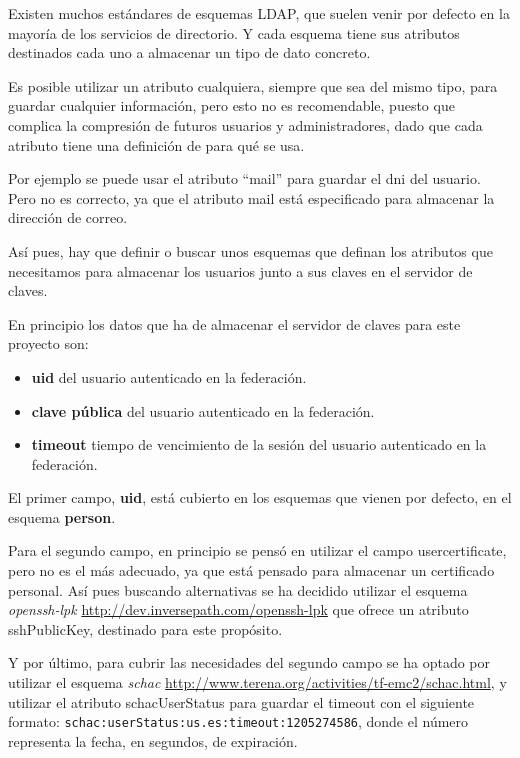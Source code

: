     Existen muchos estándares de esquemas LDAP, que suelen venir por defecto
    en la mayoría de los servicios de directorio. Y cada esquema tiene sus
    atributos destinados cada uno a almacenar un tipo de dato concreto.

    Es posible utilizar un atributo cualquiera, siempre que sea del mismo
    tipo, para guardar cualquier información, pero esto no es recomendable,
    puesto que complica la compresión de futuros usuarios y
    administradores, dado que cada atributo tiene una definición de para qué
    se usa.

    Por ejemplo se puede usar el atributo ``mail'' para guardar el dni del
    usuario. Pero no es correcto, ya que el atributo mail está especificado
    para almacenar la dirección de correo.

    Así pues, hay que definir o buscar unos esquemas que definan los
    atributos que necesitamos para almacenar los usuarios junto a sus claves
    en el servidor de claves.


    En principio los datos que ha de almacenar el servidor de claves para
    este proyecto son:

    \begin{itemize}

    \item \textbf{uid} del usuario autenticado en la federación.
    \item \textbf{clave pública} del usuario autenticado en la federación.
    \item \textbf{timeout} tiempo de vencimiento de la sesión del usuario autenticado en la federación.

    \end{itemize}

    El primer campo, \textbf{uid}, está cubierto en los esquemas que vienen
    por defecto, en el esquema \textbf{person}.

    Para el segundo campo, en principio se pensó en utilizar el campo
    usercertificate, pero no es el más adecuado, ya que está pensado para
    almacenar un certificado personal. Así pues buscando alternativas se ha
    decidido utilizar el esquema \textit{openssh-lpk}
    \url{http://dev.inversepath.com/openssh-lpk} que ofrece un atributo
    sshPublicKey, destinado para este propósito.

    Y por último, para cubrir las necesidades del segundo campo se ha
    optado por utilizar el esquema \textit{schac}
    \url{http://www.terena.org/activities/tf-emc2/schac.html}, y utilizar
    el atributo schacUserStatus para guardar el timeout con el siguiente
    formato: \texttt{schac:userStatus:us.es:timeout:1205274586}, donde el
    número representa la fecha, en segundos, de expiración.

